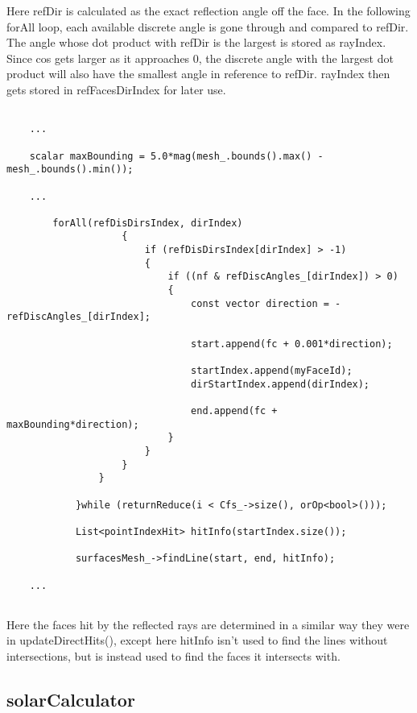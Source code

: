 Here refDir is calculated as the exact reflection angle off the face. In the following forAll loop, each available discrete angle is gone through and compared to refDir. The angle whose dot product with refDir is the largest is stored as rayIndex. Since cos gets larger as it approaches 0, the discrete angle with the largest dot product will also have the smallest angle in reference to refDir. rayIndex then gets stored in refFacesDirIndex for later use.

\begin{verbatim}

    ...

    scalar maxBounding = 5.0*mag(mesh_.bounds().max() - mesh_.bounds().min());

    ...

        forAll(refDisDirsIndex, dirIndex)
                    {
                        if (refDisDirsIndex[dirIndex] > -1)
                        {
                            if ((nf & refDiscAngles_[dirIndex]) > 0)
                            {
                                const vector direction = -refDiscAngles_[dirIndex];
        
                                start.append(fc + 0.001*direction);
        
                                startIndex.append(myFaceId);
                                dirStartIndex.append(dirIndex);
        
                                end.append(fc + maxBounding*direction);
                            }
                        }
                    }
                }
        
            }while (returnReduce(i < Cfs_->size(), orOp<bool>()));
        
            List<pointIndexHit> hitInfo(startIndex.size());
        
            surfacesMesh_->findLine(start, end, hitInfo);
                        
    ...
    
\end{verbatim}

Here the faces hit by the reflected rays are determined in a similar way they were in updateDirectHits(), except here hitInfo isn't used to find the lines without intersections, but is instead used to find the faces it intersects with.


\subsection{solarCalculator}

